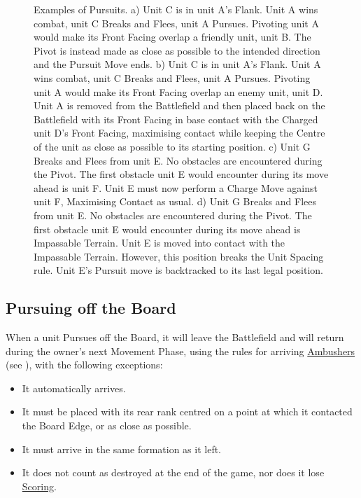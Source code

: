 {\begin{figure}[!htbp]
	\renewcommand{\figbiglettersize}{17}
	\begin{minipage}{0.53\textwidth}
	\def\svgwidth{\textwidth}
	
	\end{minipage}\hfill\begin{minipage}{0.44\textwidth}
	\caption{Examples of Pursuits.\captionpar
	a) Unit C is in unit A's Flank. Unit A wins combat, unit C Breaks and Flees, unit A Pursues. Pivoting unit A would make its Front Facing overlap a friendly unit, unit B. The Pivot is instead made as close as possible to the intended direction and the Pursuit Move ends.\vspace*{1.5cm}\captionpar
	b) Unit C is in unit A's Flank. Unit A wins combat, unit C Breaks and Flees, unit A Pursues. Pivoting unit A would make its Front Facing overlap an enemy unit, unit D. Unit A is removed from the Battlefield and then placed back on the Battlefield with its Front Facing in base contact with the Charged unit D's Front Facing, maximising contact while keeping the Centre of the unit as close as possible to its starting position.\vspace*{3.5cm}\captionpar
	c) Unit G Breaks and Flees from unit E. No obstacles are encountered during the Pivot. The first obstacle unit E would encounter during its move ahead is unit F. Unit E must now perform a Charge Move against unit F, Maximising Contact as usual.\vspace*{4cm}\captionpar
	d) Unit G Breaks and Flees from unit E. No obstacles are encountered during the Pivot. The first obstacle unit E would encounter during its move ahead is Impassable Terrain. Unit E is moved into contact with the Impassable Terrain. However, this position breaks the Unit Spacing rule. Unit E's Pursuit move is backtracked to its last legal position.\vspace*{1cm}}
	\label{figure/pursuit}
	\end{minipage}
\end{figure}

\clearpage
\subsection{Pursuing off the Board}
\label{pursuing_off_the_board}

When a unit Pursues off the Board, it will leave the Battlefield and will return during the owner's next Movement Phase, using the rules for arriving \hyperref[ambush]{Ambushers} (see ), with the following exceptions:
\begin{itemize}
\item It automatically arrives.
\item It must be placed with its rear rank centred on a point at which it contacted the Board Edge, or as close as possible.
\item It must arrive in the same formation as it left.
\item It does not count as destroyed at the end of the game, nor does it lose \hyperref[scoring]{Scoring}.
\end{itemize}

}
